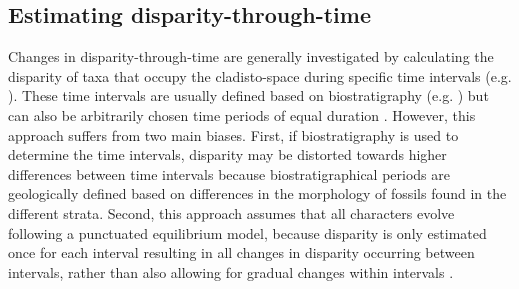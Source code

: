 \documentclass[10pt,letterpaper]{article}
\begin{document}
\subsection*{Estimating disparity-through-time} 
Changes in disparity-through-time are generally investigated by calculating the disparity of taxa that occupy the cladisto-space during specific time intervals (e.g. \cite{cisneros2010,prentice2011,Hughes20082013,hopkinsdecoupling2013,bentonmodels2014,bensonfaunal2014}).
These time intervals are usually defined based on biostratigraphy (e.g. \cite{cisneros2010,prentice2011,Hughes20082013,bentonmodels2014}) but can also be arbitrarily chosen time periods of equal duration \cite{Butler2012,hopkinsdecoupling2013,bensonfaunal2014}.
However, this approach suffers from two main biases. 
First, if biostratigraphy is used to determine the time intervals, disparity may be distorted towards higher differences between time intervals because biostratigraphical periods are geologically defined based on differences in the morphology of fossils found in the different strata.
Second, this approach assumes that all characters evolve following a punctuated equilibrium model, because disparity is only estimated once for each interval resulting in all changes in disparity occurring between intervals, rather than also allowing for gradual changes within intervals \cite{Hunt21042015}.
\end{document}
